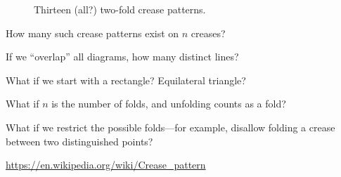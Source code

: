 \documentclass{article}
\begin{document}
\begin{figure}[ht!]

  \caption{
    Thirteen (all?) two-fold crease patterns.
  }
\end{figure}
\begin{question}
  How many such crease patterns exist on $n$ creases?
\end{question}

\begin{related}
  \item If we ``overlap'' all diagrams, how many distinct lines?
  \item What if we start with a rectangle? Equilateral triangle?
  \item What if $n$ is the number of folds, and unfolding counts as a fold?
  \item What if we restrict the possible folds---for example, disallow folding
  a crease between two distinguished points?
\end{related}
\begin{references}
  \item \url{https://en.wikipedia.org/wiki/Crease_pattern}
\end{references}
\end{document}
